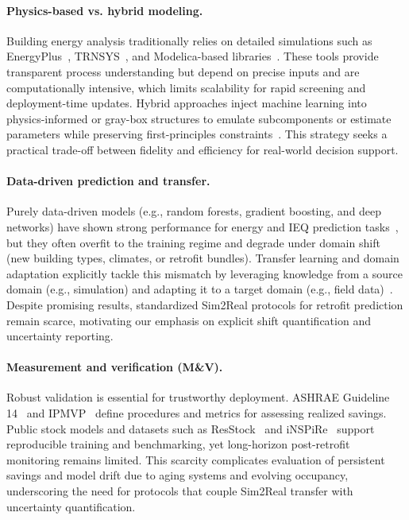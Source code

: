 ﻿\documentclass{article}
\begin{document}
\paragraph{Physics-based vs. hybrid modeling.} Building energy analysis traditionally relies on detailed simulations such as EnergyPlus~\citep{crawley2001energyplus}, TRNSYS~\citep{klein2017trnsys}, and Modelica-based libraries~\citep{wang2015modelica}. These tools provide transparent process understanding but depend on precise inputs and are computationally intensive, which limits scalability for rapid screening and deployment-time updates. Hybrid approaches inject machine learning into physics-informed or gray-box structures to emulate subcomponents or estimate parameters while preserving first-principles constraints~\citep{drgona2020all,heinen2022flexibility}. This strategy seeks a practical trade-off between fidelity and efficiency for real-world decision support.

\paragraph{Data-driven prediction and transfer.} Purely data-driven models (e.g., random forests, gradient boosting, and deep networks) have shown strong performance for energy and IEQ prediction tasks~\citep{ahmad2017review,li2021review,smarra2018data}, but they often overfit to the training regime and degrade under domain shift (new building types, climates, or retrofit bundles). Transfer learning and domain adaptation explicitly tackle this mismatch by leveraging knowledge from a source domain (e.g., simulation) and adapting it to a target domain (e.g., field data)~\citep{hong2020transfer,mahnke2022transfer,li2022domain}. Despite promising results, standardized Sim2Real protocols for retrofit prediction remain scarce, motivating our emphasis on explicit shift quantification and uncertainty reporting.

\paragraph{Measurement and verification (M\&V).} Robust validation is essential for trustworthy deployment. ASHRAE Guideline 14~\citep{ashrae2014guideline} and IPMVP~\citep{ipmvp2012} define procedures and metrics for assessing realized savings. Public stock models and datasets such as ResStock~\citep{resstock2017} and iNSPiRe~\citep{wolf2014inspire} support reproducible training and benchmarking, yet long-horizon post-retrofit monitoring remains limited. This scarcity complicates evaluation of persistent savings and model drift due to aging systems and evolving occupancy, underscoring the need for protocols that couple Sim2Real transfer with uncertainty quantification.
\end{document}

